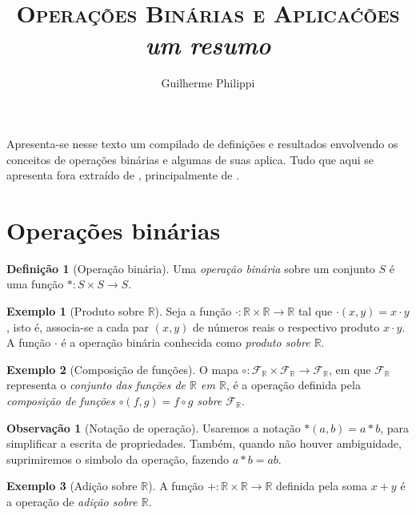 \documentclass[a4paper,12pt]{article}
\title{\textsc{Operações Binárias e Aplicaćões}\\ \textsl{um resumo}}
\author{Guilherme Philippi}
\theoremstyle{plain}
\theoremstyle{definition}
\newtheorem{definicao}{Definição}[section]
\newtheorem{observacao}{Observação}[section]
\newtheorem{exemplo}{Exemplo}[section]
\begin{document}
	\maketitle
	
	Apresenta-se nesse texto um compilado de definições e resultados envolvendo os conceitos de operações binárias e algumas de suas aplica. Tudo que aqui se apresenta fora extraído de \cite{johnAlgebra, michalAlgebra, maierAlgebra}, principalmente de \cite{johnAlgebra}.

\section{Operações binárias}

\begin{definicao}[Operação binária]
	Uma \emph{operação binária} sobre um conjunto \(S\) é uma função \(*: S\times S \longrightarrow S\).
\end{definicao}

\begin{exemplo}[Produto sobre $\mathbb{R}$]
	Seja a função $\cdot: \mathbb{R}\times\mathbb{R}\longrightarrow\mathbb{R}$ tal que $\cdot(x,y) = x \cdot y$, isto é, associa-se a cada par $(x,y)$ de números reais o respectivo produto $x\cdot y$. A função $\cdot$ é a operação binária conhecida como \emph{produto sobre $\mathbb{R}$}.
\end{exemplo}

\begin{exemplo}[Composição de funções]
	O mapa $\circ:\mathcal{F}_\mathbb{R}\times\mathcal{F}_\mathbb{R}\longrightarrow\mathcal{F}_\mathbb{R}$, em que $\mathcal{F}_\mathbb{R}$ representa o \emph{conjunto das funções de $\mathbb{R}$ em $\mathbb{R}$}, é a operação definida pela \emph{composição de funções $\circ(f,g) = f\circ g$ sobre $\mathcal{F}_\mathbb{R}$}.
\end{exemplo}

\begin{observacao}[Notação de operação]
	Usaremos a notação \(*(a,b) = a*b\), para simplificar a escrita de
	propriedades. Também, quando não houver ambiguidade, suprimiremos o simbolo da operação, fazendo $a*b = ab$.
\end{observacao}

\begin{exemplo}[Adição sobre $\mathbb{R}$]
	A função $+: \mathbb{R}\times\mathbb{R}\longrightarrow\mathbb{R}$ definida pela soma $x+y$ é a operação de \emph{adição sobre $\mathbb{R}$}.
\end{exemplo}
\end{document}
